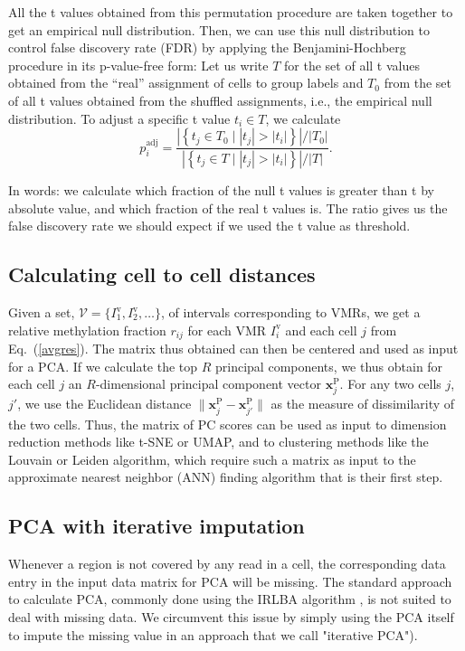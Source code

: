 \documentclass[10pt]{article}
\begin{document}
All the t values obtained from this permutation procedure are taken together to get an empirical null distribution.
Then, we can use this null distribution to control false discovery rate (FDR) by applying the Benjamini-Hochberg procedure in its p-value-free form:
Let us write $T$ for the set of all t values obtained from the ``real'' assignment of cells to group labels and $T_0$ from the set of all t values obtained from the shuffled assignments, i.e., the empirical null distribution.
To adjust a specific t value $t_i\in T$, we calculate
\[ p^\text{adj}_i = \frac{ \left|\left\{t_j\in T_0\mid|t_j| > |t_i| \right\}\right| \big/ |T_0|}
{ \left|\left\{t_j\in T\mid|t_j| > |t_i| \right\}\right| \big/ |T|}.\]

In words: we calculate which fraction of the null t values is greater than t by absolute value, and which fraction of the real t values is.
The ratio gives us the false discovery rate we should expect if we used the t value as threshold.


\subsection*{Calculating cell to cell distances}

Given a set, $\mathcal{V}=\{I^\text{v}_1,I^\text{v}_2,\dots\}$, of intervals corresponding to VMRs, we get a relative methylation fraction $r_{ij}$ for each VMR $I^\text{v}_i$ and each cell $j$ from Eq.\ (\ref{avgres}).
The matrix thus obtained can then be centered and used as input for a PCA.
If we calculate the top $R$ principal components, we thus obtain for each cell $j$ an $R$-dimensional principal component vector $\mathbf{x}^\text{P}_j$.
For any two cells $j$, $j'$, we use the Euclidean distance $\|\mathbf{x}^\text{P}_j - \mathbf{x}^\text{P}_{j'}\|$ as the measure of dissimilarity of the two cells.
Thus, the matrix of PC scores can be used as input to dimension reduction methods like t-SNE or UMAP, and to clustering methods like the Louvain or Leiden algorithm, which require such a matrix as input to the approximate nearest neighbor (ANN) finding algorithm that is their first step.

\subsection*{PCA with iterative imputation}

Whenever a region is not covered by any read in a cell, the corresponding data entry in the input data matrix for PCA will be missing.
The standard approach to calculate PCA, commonly done using the IRLBA algorithm \citep{Baglama2005}, is not suited to deal with missing data.
We circumvent this issue by simply using the PCA itself to impute the missing value in an approach that we call "iterative PCA").
\end{document}
